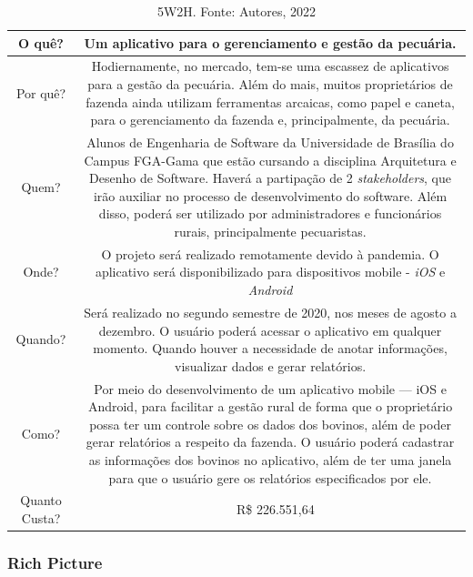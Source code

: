 \begin{table}[H]
\centering
\begin{tabular}{|C{0.08\textheight}|C{0.55\textheight}|}
    \hline
    O quê? & Um aplicativo para o gerenciamento e gestão da pecuária.\\ \hline
    Por quê? & Hodiernamente, no mercado, tem-se uma escassez de aplicativos para a gestão da pecuária. Além do mais, muitos proprietários de fazenda ainda utilizam ferramentas arcaicas, como papel e caneta, para o gerenciamento da fazenda e, principalmente, da pecuária. \\ \hline
    Quem? & Alunos de Engenharia de Software da Universidade de Brasília do Campus FGA-Gama que estão cursando a disciplina Arquitetura e Desenho de Software. Haverá a partipação de 2 \textit{stakeholders}, que irão auxiliar no processo de desenvolvimento do software. Além disso, poderá ser utilizado por administradores e funcionários rurais, principalmente pecuaristas. \\ \hline
    Onde? & O projeto será realizado remotamente devido à pandemia. O aplicativo será disponibilizado para dispositivos mobile - \textit{iOS} e \textit{Android} \\ \hline
    Quando? & Será realizado no segundo semestre de 2020, nos meses de agosto a dezembro. O usuário poderá acessar o aplicativo em qualquer momento. Quando houver a necessidade de anotar informações, visualizar dados e gerar relatórios. \\ \hline
    Como? & Por meio do desenvolvimento de um aplicativo mobile — iOS e Android, para facilitar a gestão rural de forma que o proprietário possa ter um controle sobre os dados dos bovinos, além de poder gerar relatórios a respeito da fazenda. O usuário poderá cadastrar as informações dos bovinos no aplicativo, além de ter uma janela para que o usuário gere os relatórios especificados por ele. \\ \hline
     Quanto Custa? & ~ R\$ 226.551,64 \\ \hline
\end{tabular}
\caption{5W2H. Fonte: Autores, 2022}
\label{tab:5w2h_ex}
\end{table}

\subsubsection{Rich Picture}

\label{sec:rich_picture}

